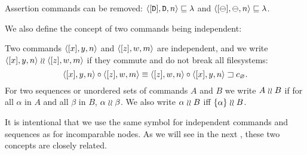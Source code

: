 \begin{myax}\label{ax_assert}
Assertion commands can be removed:
$\langle{[\mathtt{D}],\mathtt{D},n}\rangle\sqsubseteq\lambda$ and $\langle{[\ominus],\ominus,n}\rangle\sqsubseteq\lambda$.
\end{myax}



\bigskip


\noindent
We also define the concept of two commands being independent:

\begin{mydef}\label{def_indep}
Two commands $\langle{[x],y,n}\rangle$ and $\langle{[z],w,m}\rangle$ 
are independent, and we write $\langle{[x],y,n}\rangle\mathrel{\wr\wr}\langle{[z],w,m}\rangle$ if 
they commute and do not break all filesystems:
\[ \langle{[x],y,n}\rangle\circ\langle{[z],w,m}\rangle \equiv {\langle{[z],w,n}\rangle\circ\langle{[x],y,n}\rangle}\sqsupset c_\varnothing. \]
For two sequences or unordered sets of commands $A$ and $B$ we write $A\mathrel{\wr\wr} B$ if
for all $\alpha$ in $A$ and all $\beta$ in $B$, $\alpha\mathrel{\wr\wr}\beta$.
We also write $\alpha\mathrel{\wr\wr} B$ iff $\{\alpha\}\mathrel{\wr\wr} B$.
\end{mydef}

It is intentional that we use the same symbol for independent commands
and sequences as for incomparable nodes. As we will see in the next
,
these two concepts are closely related.

